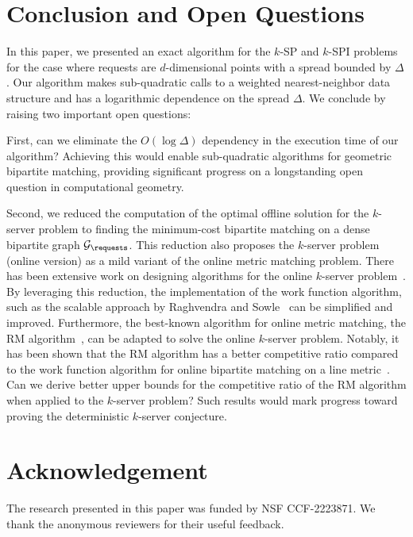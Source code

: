 \section{Conclusion and Open Questions}\label{sec:conclusion}
In this paper, we presented an exact algorithm for the $k$-SP and $k$-SPI problems for the case where requests are $d$-dimensional points with a spread bounded by $\Delta$. Our algorithm makes sub-quadratic calls to a weighted nearest-neighbor data structure and has a logarithmic dependence on the spread $\Delta$.  We conclude by raising two important open questions:

First, can we eliminate the $O(\log \Delta)$ dependency in the execution time of our algorithm? Achieving this would enable sub-quadratic algorithms for geometric bipartite matching, providing significant progress on a longstanding open question in computational geometry. 

Second, we reduced the computation of the optimal offline solution for the $k$-server problem to finding the minimum-cost bipartite matching on a dense bipartite graph $\mathcal{G}_\requests$. This reduction also proposes the $k$-server problem (online version) as a mild variant of the online metric matching problem. There has been extensive work on designing algorithms for the online $k$-server problem~\cite{bubeck2018k,S7,S16,S3, jamesLee2018, S14, raghvendra2022scalable, rudec2013fast}. By leveraging this reduction, the implementation of the work function algorithm, such as the scalable approach by Raghvendra and Sowle~\cite{raghvendra2022scalable} can be simplified and improved. Furthermore, the best-known algorithm for online metric matching, the RM algorithm~\cite{my_focs_paper, raghvendra2016robust}, can be adapted to solve the online $k$-server problem. Notably, it has been shown that the RM algorithm has a better competitive ratio compared to the work function algorithm for online bipartite matching on a line metric~\cite{s_socg18}. Can we derive better upper bounds for the competitive ratio of the RM algorithm when applied to the $k$-server problem? Such results would mark progress toward proving the deterministic $k$-server conjecture. 

\section*{Acknowledgement}
The research presented in this paper was funded by NSF CCF-2223871. We thank the anonymous reviewers for their useful feedback.




